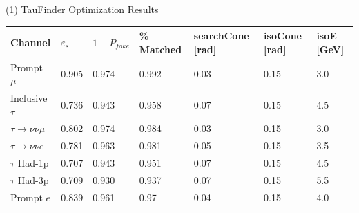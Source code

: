 \documentclass[10pt]{beamer}
\begin{document}
\begin{frame}{(1) TauFinder Optimization Results}
\scriptsize
\begin{tabular}{|p{}|p{}p{}p{}p{}p{}p{}|}

\hline 
Channel & $\varepsilon_s$ & $1-P_{fake}$ & \% Matched & searchCone [rad] & isoCone [rad] & isoE [GeV] \\ 
\hline 
Prompt $\mu$ & 0.905 & 0.974 & 0.992 & 0.03 & 0.15 & 3.0 \\ 

Inclusive $\tau$ & 0.736 & 0.943 & 0.958 & 0.07 & 0.15 & 4.5 \\ 
 
$\tau \rightarrow \nu \nu \mu$ & 0.802 & 0.974 & 0.984 & 0.03 & 0.15 & 3.0 \\ 
 
$\tau \rightarrow \nu \nu e$ & 0.781 & 0.963 & 0.981 & 0.05 & 0.15 & 3.5 \\ 
 
$\tau$ Had-1p & 0.707 & 0.943 & 0.951 & 0.07 & 0.15 & 4.5 \\ 
 
$\tau$ Had-3p & 0.709 & 0.930 & 0.937 & 0.07 & 0.15 & 5.5 \\ 
 
Prompt $e$ & 0.839 & 0.961 & 0.97 & 0.04 & 0.15 & 4.0 \\ 
\hline 
\end{tabular} 




\end{frame}
\end{document}
